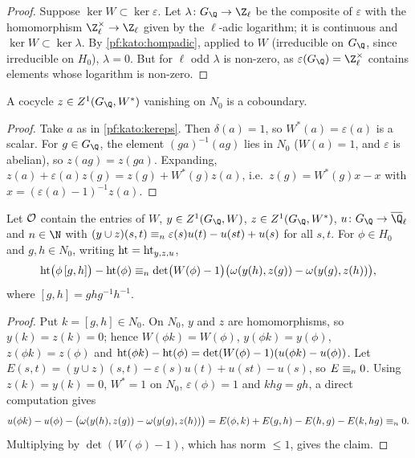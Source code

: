 \begin{proof}
Suppose $\ker W\subset\ker\varepsilon$. Let $\lambda\colon G_\Q\to\Z_\ell$ be the composite of $\varepsilon$ with the homomorphism
$\Z_\ell^\times\to\Z_\ell$ given by the $\ell$-adic logarithm; it is continuous and $\ker W\subset\ker\lambda$. By \cref{pf:kato:hompadic}, applied to $W$ (irreducible on $G_\Q$, since irreducible
on $H_0$), $\lambda=0$. But for
$\ell$ odd $\lambda$ is non-zero, as $\varepsilon(G_\Q)=\Z_\ell^\times$ contains elements whose logarithm is non-zero.
\end{proof}

\begin{lemma}\label{pf:kato:dualkill}
A cocycle $z\in\katoZ(G_\Q,W^*)$ vanishing on $N_0$ is a coboundary.
\end{lemma}

\begin{proof}
Take $a$ as in \cref{pf:kato:kereps}. Then $\delta(a)=1$, so $W^*(a)=\varepsilon(a)$ is a scalar. For $g\in G_\Q$, the element
$(ga)^{-1}(ag)$ lies in $N_0$ ($W(a)=1$, and $\varepsilon$ is abelian), so $z(ag)=z(ga)$. Expanding,
$z(a)+\varepsilon(a)z(g)=z(g)+W^*(g)z(a)$, i.e.\ $z(g)=W^*(g)x-x$ with $x=(\varepsilon(a)-1)^{-1}z(a)$.
\end{proof}

\begin{lemma}\label{pf:kato:htcomm}
Let $\mathcal{O}$ contain the entries of $W$, $y\in\katoZ(G_\Q,W)$, $z\in\katoZ(G_\Q,W^*)$, $u\colon G_\Q\to\katoQlb$ and $n\in\N$ with
$(y\cup z)(s,t)\equiv_{n}\varepsilon(s)u(t)-u(st)+u(s)$ for all $s,t$. For $\phi\in H_0$ and $g,h\in N_0$, writing $\mathrm{ht}=\mathrm{ht}_{y,z,u}$,
\[
  \mathrm{ht}\bigl(\phi\,[g,h]\bigr)-\mathrm{ht}(\phi)\equiv_{n}\det\bigl(W(\phi)-1\bigr)\bigl(\omega(y(h),z(g))-\omega(y(g),z(h))\bigr),
\]
where $[g,h]=ghg^{-1}h^{-1}$.
\end{lemma}

\begin{proof}
Put $k=[g,h]\in N_0$. On $N_0$, $y$ and $z$ are homomorphisms, so $y(k)=z(k)=0$; hence $W(\phi k)=W(\phi)$, $y(\phi k)=y(\phi)$,
$z(\phi k)=z(\phi)$ and $\mathrm{ht}(\phi k)-\mathrm{ht}(\phi)=\det(W(\phi)-1)(u(\phi k)-u(\phi))$. Let
$E(s,t)=(y\cup z)(s,t)-\varepsilon(s)u(t)+u(st)-u(s)$, so $E\equiv_{n}0$. Using $z(k)=y(k)=0$, $W^*=1$ on $N_0$, $\varepsilon(\phi)=1$ and
$khg=gh$, a direct computation gives
\[
  u(\phi k)-u(\phi)-\bigl(\omega(y(h),z(g))-\omega(y(g),z(h))\bigr)=E(\phi,k)+E(g,h)-E(h,g)-E(k,hg)\equiv_{n}0.
\]
Multiplying by $\det(W(\phi)-1)$, which has norm $\le1$, gives the claim.
\end{proof}

